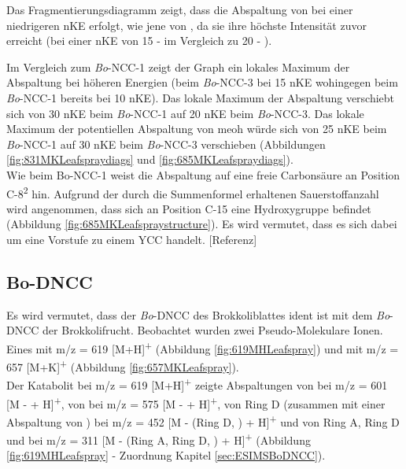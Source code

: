 Das Fragmentierungsdiagramm zeigt, dass die Abspaltung von  bei einer niedrigeren \gls{nKE} erfolgt, wie jene von , da sie ihre höchste Intensität zuvor erreicht (bei einer \gls{nKE} von 15 -  im Vergleich zu 20 - ). 

Im Vergleich zum \textit{Bo}-NCC-1 zeigt der Graph ein lokales Maximum der  Abspaltung bei höheren Energien (beim \textit{Bo}-NCC-3 bei 15 \gls{nKE} wohingegen beim \textit{Bo}-NCC-1 bereits bei 10 \gls{nKE}). Das lokale Maximum der  Abspaltung verschiebt sich von 30 \gls{nKE} beim \textit{Bo}-NCC-1 auf 20 \gls{nKE} beim \textit{Bo}-NCC-3. Das lokale Maximum der potentiellen Abspaltung von \gls{meoh} würde sich von 25 \gls{nKE} beim \textit{Bo}-NCC-1 auf 30 \gls{nKE} beim \textit{Bo}-NCC-3 verschieben (Abbildungen \ref{fig:831MKLeafspraydiags} und \ref{fig:685MKLeafspraydiags}).\\ 

Wie beim Bo-NCC-1 weist die  Abspaltung auf eine freie Carbonsäure an Position C-8\textsuperscript{2} hin. Aufgrund der durch die Summenformel erhaltenen Sauerstoffanzahl wird angenommen, dass sich an Position C-15 eine Hydroxygruppe befindet (Abbildung \ref{fig:685MKLeafspraystructure}). Es wird vermutet, dass es sich dabei um eine Vorstufe zu einem \gls{YCC} handelt. [Referenz]

\subsection{Bo-DNCC}

Es wird vermutet, dass der \textit{Bo}-DNCC des Brokkoliblattes ident ist mit dem \textit{Bo}-DNCC der Brokkolifrucht. \cite{ChlorophyllCatabolitesBroccoli} Beobachtet wurden zwei Pseudo-Molekulare Ionen. Eines mit m/z = 619 [M+H]\textsuperscript{+} (Abbildung \ref{fig:619MHLeafspray}) und mit m/z = 657 [M+K]\textsuperscript{+} (Abbildung \ref{fig:657MKLeafspray}).\\

Der Katabolit bei m/z = 619 [M+H]\textsuperscript{+} zeigte Abspaltungen von  bei m/z = 601 [M -  + H]\textsuperscript{+}, von  bei m/z = 575 [M -  + H]\textsuperscript{+}, von Ring D (zusammen mit einer Abspaltung von ) bei m/z = 452 [M - (Ring D, ) + H]\textsuperscript{+} und von Ring A, Ring D und  bei m/z = 311 [M - (Ring A, Ring D, ) + H]\textsuperscript{+} (Abbildung \ref{fig:619MHLeafspray} - Zuordnung Kapitel \ref{sec:ESIMSBoDNCC}).

